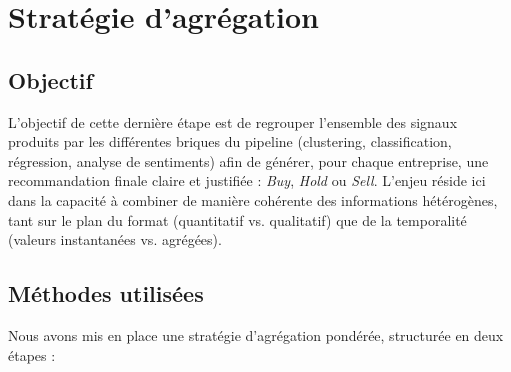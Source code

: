 \documentclass[a4paper,12pt]{article}
\begin{document}
\section{Stratégie d’agrégation}

\subsection*{Objectif}

L’objectif de cette dernière étape est de regrouper l’ensemble des signaux produits par les différentes briques du pipeline (clustering, classification, régression, analyse de sentiments) afin de générer, pour chaque entreprise, une recommandation finale claire et justifiée : \textit{Buy}, \textit{Hold} ou \textit{Sell}. L’enjeu réside ici dans la capacité à combiner de manière cohérente des informations hétérogènes, tant sur le plan du format (quantitatif vs. qualitatif) que de la temporalité (valeurs instantanées vs. agrégées).

\subsection*{Méthodes utilisées}

Nous avons mis en place une stratégie d’agrégation pondérée, structurée en deux étapes :
\end{document}
